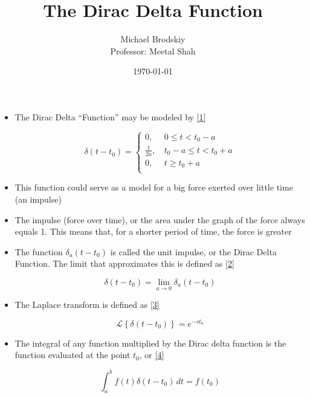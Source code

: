 \documentclass[12pt]{article}
\title{The Dirac Delta Function}
\date{\today}
\author{Michael Brodskiy\\ \small Professor: Meetal Shah}
\begin{document}
\maketitle

\begin{itemize}

  \item The Dirac Delta ``Function'' may be modeled by \eqref{1}

    \begin{equation}
      \delta(t-t_0)=\left\{\begin{array}{ll} 0,\, & 0\leq t < t_0-a\\ \frac{1}{2a},\, & t_0-a\leq t < t_0+a\\ 0,\, & t\geq t_0 + a\\ \end{array}
      \label{1}
    \end{equation}

  \item This function could serve as a model for a big force exerted over little time (an impulse)

  \item The impulse (force over time), or the area under the graph of the force always equals 1. This means that, for a shorter period of time, the force is greater

  \item The function $\delta_a(t-t_0)$ is called the unit impulse, or the Dirac Delta Function. The limit that approximates this is defined as \eqref{2}

    \begin{equation}
      \delta (t-t_0)=\lim_{a\to0}\delta_a(t-t_0)
      \label{2}
    \end{equation}

  \item The Laplace transform is defined as \eqref{3}

    \begin{equation}
      \mathcal{L}\left\{ \delta(t-t_0) \right\}=e^{-st_0}
      \label{3}
    \end{equation}

  \item The integral of any function multiplied by the Dirac delta function is the function evaluated at the point $t_0$, or \eqref{4}

    \begin{equation}
      \int_a^{b} f(t)\delta(t-t_0)\,dt=f(t_0)
      \label{4}
    \end{equation}

\end{itemize}
\end{document}
